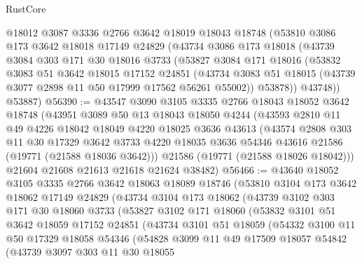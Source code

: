 \begin{lexlean}{RustCore}
\begin{coremodule}
    @18012
    @3087
    @3336
    @2766
    @3642
    @18019
    @18043
    @18748
    (@53810
      @3086
      @173
      @3642
      @18018
      @17149
      @24829
      (@43734
        @3086
        @173
        @18018
        (@43739
          @3084
          @303
          @171
          @30
          @18016
          @3733
          (@53827
            @3084
            @171
            @18016
            (@53832
              @3083
              @51
              @3642
              @18015
              @17152
              @24851
              (@43734 @3083 @51 @18015 (@43739 @3077 @2898 @11 @50 @17999 @17562 @56261 @55002))
              @53878))
          @43748))
      @53887)
@56390 := @43547
    @3090
    @3105
    @3335
    @2766
    @18043
    @18052
    @3642
    @18748
    (@43951
      @3089
      @50
      @13
      @18043
      @18050
      @4244
      (@43593
        @2810
        @11
        @49
        @4226
        @18042
        @18049
        @4220
        @18025
        @3636
        @43613
        (@43574
          @2808
          @303
          @11
          @30
          @17329
          @3642
          @3733
          @4220
          @18035
          @3636
          @54346
          @43616
          @21586
          (@19771 (@21588 @18036 @3642)))
        @21586
        (@19771 (@21588 @18026 @18042)))
      @21604
      @21608
      @21613
      @21618
      @21624
      @38482)
@56466 := @43640
    @18052
    @3105
    @3335
    @2766
    @3642
    @18063
    @18089
    @18746
    (@53810
      @3104
      @173
      @3642
      @18062
      @17149
      @24829
      (@43734
        @3104
        @173
        @18062
        (@43739
          @3102
          @303
          @171
          @30
          @18060
          @3733
          (@53827
            @3102
            @171
            @18060
            (@53832
              @3101
              @51
              @3642
              @18059
              @17152
              @24851
              (@43734
                @3101
                @51
                @18059
                (@54332
                  @3100
                  @11
                  @50
                  @17329
                  @18058
                  @54346
                  (@54828
                    @3099
                    @11
                    @49
                    @17509
                    @18057
                    @54842
                    (@43739
                      @3097
                      @303
                      @11
                      @30
                      @18055

\end{coremodule}
\end{lexlean}
